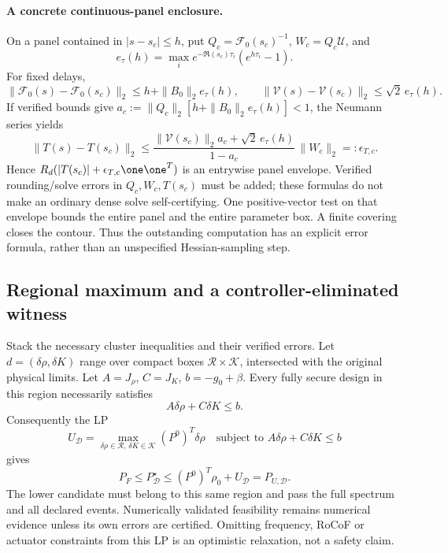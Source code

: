 \paragraph{A concrete continuous-panel enclosure.}
On a panel contained in $|s-s_c|\le h$, put
$Q_c=\mathcal F_0(s_c)^{-1}$,
$W_c=Q_c\mathcal U$, and
\[
 e_\tau(h)=\max_i e^{-\Re(s_c)\tau_i}
                     (e^{h\tau_i}-1).
\]
For fixed delays,
\[
 \|\mathcal F_0(s)-\mathcal F_0(s_c)\|_2
 \le h+\|B_0\|_2e_\tau(h),\qquad
 \|\mathcal V(s)-\mathcal V(s_c)\|_2\le\sqrt2\,e_\tau(h).
\]
If verified bounds give
$a_c:=\|Q_c\|_2[h+\|B_0\|_2e_\tau(h)]<1$,
the Neumann series yields
\begin{equation}
 \|T(s)-T(s_c)\|_2
 \le
 \frac{\|\mathcal V(s_c)\|_2 a_c+\sqrt2\,e_\tau(h)}
      {1-a_c}\,\|W_c\|_2=:\epsilon_{T,c}. \label{eq:panel}
\end{equation}
Hence $R_d(|T(s_c)|+\epsilon_{T,c}\one\one^T)$ is an
entrywise panel envelope. Verified rounding/solve errors in
$Q_c,W_c,T(s_c)$ must be added; these formulas do not make an
ordinary dense solve self-certifying.
One positive-vector test on that envelope bounds the entire panel
and the entire parameter box. A finite covering closes the contour.
Thus the outstanding computation has an explicit error formula,
rather than an unspecified Hessian-sampling step.

\subsection{Regional maximum and a controller-eliminated witness}
Stack the necessary cluster inequalities and their verified errors.
Let $d=(\delta\rho,\delta K)$ range over compact boxes
$\mathcal R\times\mathcal K$, intersected with the original physical
limits. Let $A=J_\rho$, $C=J_K$, $b=-g_0+\beta$.
Every fully secure design in this region necessarily satisfies
\[
 A\delta\rho+C\delta K\le b.
\]
Consequently the LP
\begin{equation}
 U_{\mathcal D}=\max_{\delta\rho\in\mathcal R,\,
                         \delta K\in\mathcal K}
 (P^0)^T\delta\rho\quad
 \text{subject to }A\delta\rho+C\delta K\le b \label{eq:regionalLP}
\end{equation}
gives
\begin{equation}
 \boxed{P_F\le P^\star_{\mathcal D}
 \le (P^0)^T\rho_0+U_{\mathcal D}=P_{U,\mathcal D}.}
 \label{eq:regional-bracket}
\end{equation}
The lower candidate must belong to this same region and pass the full
spectrum and all declared events. Numerically validated feasibility
remains numerical evidence unless its own errors are certified.
Omitting frequency, RoCoF or actuator constraints from this LP is an
optimistic relaxation, not a safety claim.

